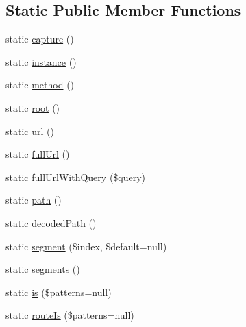 \subsection*{Static Public Member Functions}
\begin{DoxyCompactItemize}
\item 
static \mbox{\hyperlink{class_illuminate_1_1_support_1_1_facades_1_1_request_a04c59f7a4652190ee9b815a246d4d030}{capture}} ()
\item 
static \mbox{\hyperlink{class_illuminate_1_1_support_1_1_facades_1_1_request_a46303e78a0876d7bba541b64581aec66}{instance}} ()
\item 
static \mbox{\hyperlink{class_illuminate_1_1_support_1_1_facades_1_1_request_af4fe38392dfdd7f5daa7d2d811bad24d}{method}} ()
\item 
static \mbox{\hyperlink{class_illuminate_1_1_support_1_1_facades_1_1_request_a49120cc9c3ade50c8d5ede20c186a1a4}{root}} ()
\item 
static \mbox{\hyperlink{class_illuminate_1_1_support_1_1_facades_1_1_request_a2989a827618b1759471556aaacfe446f}{url}} ()
\item 
static \mbox{\hyperlink{class_illuminate_1_1_support_1_1_facades_1_1_request_a45110aa4e3e4f712691453fd39a241e0}{full\+Url}} ()
\item 
static \mbox{\hyperlink{class_illuminate_1_1_support_1_1_facades_1_1_request_a078d7acddf08cbc6d1b71efcdbebcde6}{full\+Url\+With\+Query}} (\$\mbox{\hyperlink{class_illuminate_1_1_support_1_1_facades_1_1_request_abaa6d157fd299de004ac80239a11aa5a}{query}})
\item 
static \mbox{\hyperlink{class_illuminate_1_1_support_1_1_facades_1_1_request_ad288b957470d9cdb3b2b35c65c6e7a4c}{path}} ()
\item 
static \mbox{\hyperlink{class_illuminate_1_1_support_1_1_facades_1_1_request_a5ef76eb084577dcaeb0f17dac3b13192}{decoded\+Path}} ()
\item 
static \mbox{\hyperlink{class_illuminate_1_1_support_1_1_facades_1_1_request_a860203430647b4261b5ecbdd04242dd0}{segment}} (\$index, \$default=null)
\item 
static \mbox{\hyperlink{class_illuminate_1_1_support_1_1_facades_1_1_request_ad63ac5bdb7a81ce91043fda9e7e88685}{segments}} ()
\item 
static \mbox{\hyperlink{class_illuminate_1_1_support_1_1_facades_1_1_request_aee3d15739be982a658320ac868c16a43}{is}} (\$patterns=null)
\item 
static \mbox{\hyperlink{class_illuminate_1_1_support_1_1_facades_1_1_request_a3d91ee547365fbae69326d4331b12457}{route\+Is}} (\$patterns=null)

\end{DoxyCompactItemize}
